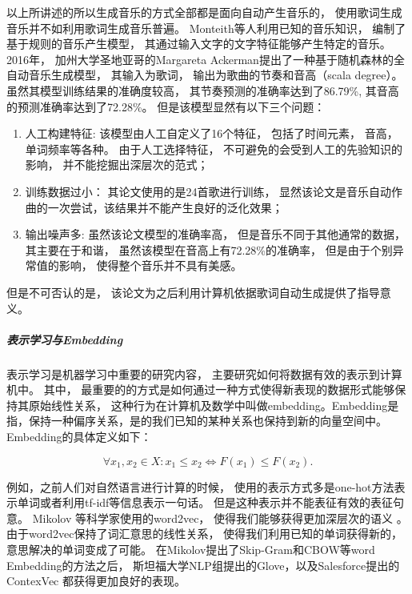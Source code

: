 以上所讲述的所以生成音乐的方式全部都是面向自动产生音乐的， 使用歌词生成音乐并不如利用歌词生成音乐普遍。 Monteith等人利用已知的音乐知识， 编制了基于规则的音乐产生模型， 其通过输入文字的文字特征能够产生特定的音乐。 2016年， 加州大学圣地亚哥的Margareta Ackerman提出了一种基于随机森林的全自动音乐生成模型， 其输入为歌词， 输出为歌曲的节奏和音高（scala degree）。 虽然其模型训练结果的准确度较高， 其节奏预测的准确率达到了86.79\%, 其音高的预测准确率达到了72.28\%。 但是该模型显然有以下三个问题： 

\begin{enumerate}

\item{人工构建特征}: 该模型由人工自定义了16个特征， 包括了时间元素， 音高， 单词频率等各种。 由于人工选择特征， 不可避免的会受到人工的先验知识的影响， 并不能挖掘出深层次的范式； 
\item{训练数据过小}： 其论文使用的是24首歌进行训练， 显然该论文是音乐自动作曲的一次尝试，该结果并不能产生良好的泛化效果；
\item{输出噪声多}: 虽然该论文模型的准确率高， 但是音乐不同于其他通常的数据， 其主要在于和谐， 虽然该模型在音高上有72.28\%的准确率， 但是由于个别异常值的影响， 使得整个音乐并不具有美感。 

\end{enumerate}

但是不可否认的是， 该论文为之后利用计算机依据歌词自动生成提供了指导意义。 


\subparagraph{表示学习与Embedding} 表示学习是机器学习中重要的研究内容， 主要研究如何将数据有效的表示到计算机中。 其中， 最重要的的方式是如何通过一种方式使得新表现的数据形式能够保持其原始线性关系\cite{embedding}， 这种行为在计算机及数学中叫做embedding。Embedding是指，保持一种偏序关系，是的我们已知的某种关系也保持到新的向量空间中。 Embedding的具体定义如下：

$$ \forall x_{1},x_{2}\in X:x_{1}\leq x_{2}\Leftrightarrow F(x_{1})\leq F(x_{2}). $$


例如，之前人们对自然语言进行计算的时候， 使用的表示方式多是one-hot方法表示单词或者利用tf-idf等信息表示一句话。 但是这种表示并不能表征有效的表征句意。 Mikolov 等科学家使用的word2vec， 使得我们能够获得更加深层次的语义 \cite{DBLP:journals/corr/abs-1301-3781}。 由于word2vec保持了词汇意思的线性关系， 使得我们利用已知的单词获得新的，意思解决的单词变成了可能。 在Mikolov提出了Skip-Gram和CBOW等word Embedding的方法之后， 斯坦福大学NLP组提出的Glove，以及Salesforce提出的ContexVec \cite{DBLP:journals/corr/abs-1708-00107} 都获得更加良好的表现。 



